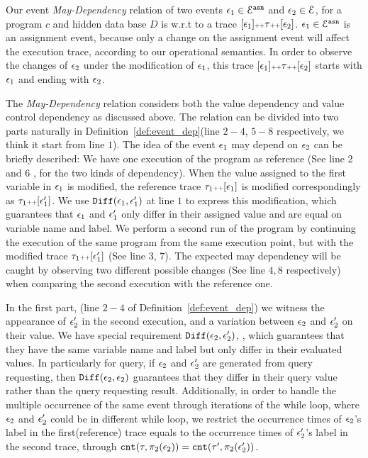 Our event \emph{May-Dependency} relation of 
two events $\mathtt{\epsilon}_1 \in \mathcal{E}^{\mathtt{{asn}}}$ and $\mathtt{\epsilon}_2 \in \mathcal{E}$, 
for a program $c$ and hidden data base $D$ is w.r.t to
a trace $[\mathtt{\epsilon}_1 ] {\scriptscriptstyle ++} \mathtt{\tau} {\scriptscriptstyle ++} [\mathtt{\epsilon}_2]$.
$\mathtt{\epsilon}_1 \in \mathcal{E}^{\mathtt{{asn}}}$ is an assignment event, because only a change on the assignment event will affect the execution trace, according to our operational semantics.
In order to observe the changes of $\mathtt{\epsilon}_2$ under the modification of $\mathtt{\epsilon}_1$, this trace 
$[\mathtt{\epsilon}_1 ] {\scriptscriptstyle ++} \mathtt{\tau} {\scriptscriptstyle ++} [\mathtt{\epsilon}_2]$
starts with $\mathtt{\epsilon}_1$ and ending with $\mathtt{\epsilon}_2$.
{The \emph{May-Dependency} relation considers both the value dependency and value control dependency as discussed above.
The relation can be divided into two parts naturally in Definition~\ref{def:event_dep}(line $2-4$, $5-8$ respectively, we think it start from line $1$). The idea of the event $\mathtt{\epsilon}_1$ may depend on $\mathtt{\epsilon}_2$ can be briefly described:
We have one execution of the program as reference (See line $2$ and $6$ , for the two kinds of dependency). 
When the value assigned to the 
first variable in $\mathtt{\epsilon}_1$ is modified, the reference trace $\mathtt{\tau}_1 {\scriptscriptstyle ++} [\mathtt{\epsilon}_1]$ is modified correspondingly as $\mathtt{\tau}_1 {\scriptscriptstyle ++} [\mathtt{\epsilon}_1']$.
We use $\mathtt{Diff}(\mathtt{\epsilon}_1, \mathtt{\epsilon}_1')$ at line $1$ to express this modification, which guarantees that $\mathtt{\epsilon}_1$ and $\mathtt{\epsilon}_1'$ only differ in their assigned value and are equal on variable name and label. We perform a second run of the program by continuing the execution of the same program from the same execution point, 
but with the modified trace $\mathtt{\tau}_1 {\scriptscriptstyle ++} [\mathtt{\epsilon}_1']$ (See line $3$, $7$). 
The expected may dependency will be caught by observing two different possible changes (See line $4, 8$ respectively) when comparing the second execution with the reference one. 

In the first part, (line $2-4$ of Definition~\ref{def:event_dep}) we witness
the appearance of $\mathtt{\epsilon}_2'$ in the second execution, and
a variation between $\mathtt{\epsilon}_2$ and $\mathtt{\epsilon}_2'$ on their value.
We have special requirement $\mathtt{Diff}(\mathtt{\epsilon}_2, \mathtt{\epsilon}_2')$,
, which guarantees that they
have the same variable name and label but only differ 
in their evaluated values.
In particularly for query, if $\mathtt{\epsilon}_2$ and $\mathtt{\epsilon}_2'$ are 
generated from query requesting, then $\mathtt{Diff}(\mathtt{\epsilon}_2, \mathtt{\epsilon}_2)$ guarantees that
they differ in their query value rather than the 
query requesting result. 
Additionally, in order to handle the multiple occurrence of the same event through iterations of the while loop,
 where  $\mathtt{\epsilon}_2$ and $\mathtt{\epsilon}_2'$ could be 
in different while loop,
we restrict the occurrence times of $\mathtt{\epsilon}_2$'s label in the first(reference) trace equals to the occurrence times of $\mathtt{\epsilon}_2'$'s label in the second trace,
through $\mathtt{cnt}(\mathtt{\tau}, \pi_2(\mathtt{\epsilon}_2))
= 
\mathtt{cnt}(\mathtt{\tau}', \pi_2(\mathtt{\epsilon}_2'))$.

}
